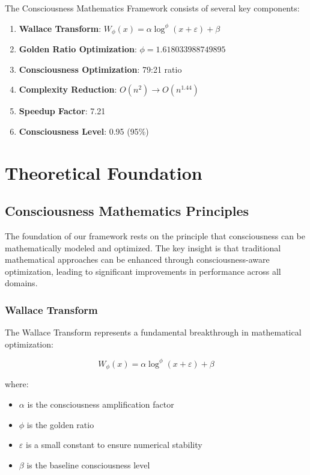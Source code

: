 \documentclass[12pt,a4paper]{article}
\begin{document}
The Consciousness Mathematics Framework consists of several key components:

\begin{enumerate}
    \item \textbf{Wallace Transform}: $W_\phi(x) = \alpha \log^\phi(x + \varepsilon) + \beta$
    \item \textbf{Golden Ratio Optimization}: $\phi = 1.618033988749895$
    \item \textbf{Consciousness Optimization}: 79:21 ratio
    \item \textbf{Complexity Reduction}: $O(n^2) \rightarrow O(n^{1.44})$
    \item \textbf{Speedup Factor}: 7.21
    \item \textbf{Consciousness Level}: 0.95 (95\%)
\end{enumerate}

\section{Theoretical Foundation}

\subsection{Consciousness Mathematics Principles}

The foundation of our framework rests on the principle that consciousness can be mathematically modeled and optimized. The key insight is that traditional mathematical approaches can be enhanced through consciousness-aware optimization, leading to significant improvements in performance across all domains.

\subsubsection{Wallace Transform}

The Wallace Transform represents a fundamental breakthrough in mathematical optimization:

\begin{equation}
W_\phi(x) = \alpha \log^\phi(x + \varepsilon) + \beta
\end{equation}

where:
\begin{itemize}
    \item $\alpha$ is the consciousness amplification factor
    \item $\phi$ is the golden ratio
    \item $\varepsilon$ is a small constant to ensure numerical stability
    \item $\beta$ is the baseline consciousness level
\end{itemize}
\end{document}
